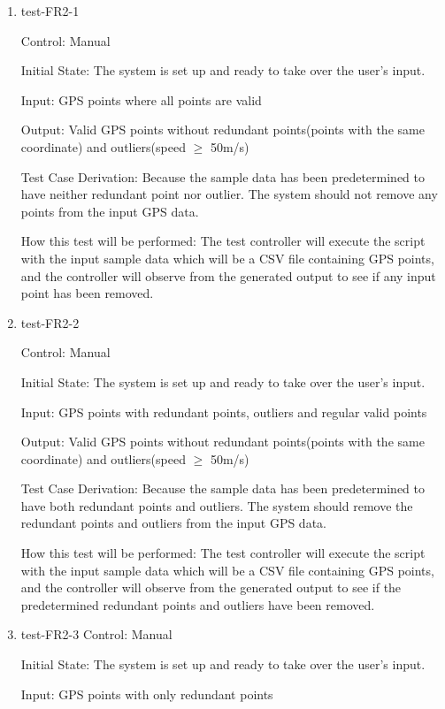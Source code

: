 \documentclass[12pt, titlepage]{article}
\begin{document}
\begin{enumerate}

\item{test-FR2-1} \label{test-FR2-1}

Control: Manual
					
Initial State: The system is set up and ready to take over the user's input.
					
Input: GPS points where all points are valid
					
Output: Valid GPS points without redundant points(points with the same coordinate) and outliers(speed $\geq$ 50m/s)

Test Case Derivation: Because the sample data has been predetermined to have neither redundant point nor outlier. The system should not remove any points from the input GPS data.

How this test will be performed: The test controller will execute the script with the input sample data which will be a CSV file containing GPS points, and the controller will observe from the generated output to see if any input point has been removed.

\item{test-FR2-2} \label{test-FR2-2}

Control: Manual
					
Initial State: The system is set up and ready to take over the user's input.
					
Input: GPS points with redundant points, outliers and regular valid points
					
Output: Valid GPS points without redundant points(points with the same coordinate) and outliers(speed $\geq$ 50m/s)

Test Case Derivation: Because the sample data has been predetermined to have both redundant points and outliers. The system should remove the redundant points and outliers from the input GPS data.

How this test will be performed: The test controller will execute the script with the input sample data which will be a CSV file containing GPS points, and the controller will observe from the generated output to see if the predetermined redundant points and outliers have been removed.

\item{test-FR2-3} \label{test-FR2-3}
Control: Manual
					
Initial State: The system is set up and ready to take over the user's input.
					
Input: GPS points with only redundant points
					

\end{enumerate}
\end{document}
